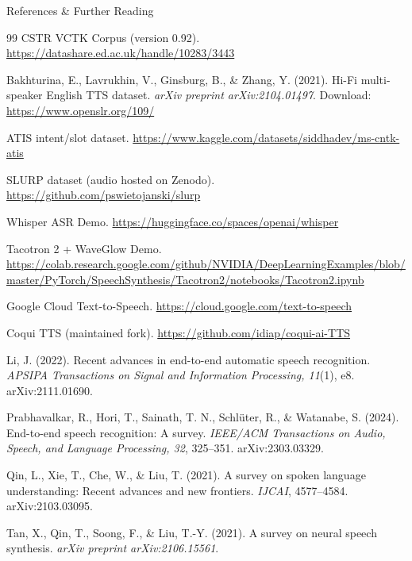 \begin{frame}[allowframebreaks]{References \& Further Reading}
\begin{thebibliography}{99}
CSTR VCTK Corpus (version 0.92). \url{https://datashare.ed.ac.uk/handle/10283/3443}

Bakhturina, E., Lavrukhin, V., Ginsburg, B., \& Zhang, Y. (2021). Hi-Fi multi-speaker English TTS dataset. \textit{arXiv preprint arXiv:2104.01497}. Download: \url{https://www.openslr.org/109/}

ATIS intent/slot dataset. \url{https://www.kaggle.com/datasets/siddhadev/ms-cntk-atis}

SLURP dataset (audio hosted on Zenodo). \url{https://github.com/pswietojanski/slurp}

Whisper ASR Demo. \url{https://huggingface.co/spaces/openai/whisper}

Tacotron 2 + WaveGlow Demo. \url{https://colab.research.google.com/github/NVIDIA/DeepLearningExamples/blob/master/PyTorch/SpeechSynthesis/Tacotron2/notebooks/Tacotron2.ipynb}

Google Cloud Text-to-Speech. \url{https://cloud.google.com/text-to-speech}

Coqui TTS (maintained fork). \url{https://github.com/idiap/coqui-ai-TTS}

Li, J. (2022). Recent advances in end-to-end automatic speech recognition. \textit{APSIPA Transactions on Signal and Information Processing, 11}(1), e8. arXiv:2111.01690.

Prabhavalkar, R., Hori, T., Sainath, T. N., Schlüter, R., \& Watanabe, S. (2024). End-to-end speech recognition: A survey. \textit{IEEE/ACM Transactions on Audio, Speech, and Language Processing, 32}, 325--351. arXiv:2303.03329.

Qin, L., Xie, T., Che, W., \& Liu, T. (2021). A survey on spoken language understanding: Recent advances and new frontiers. \textit{IJCAI}, 4577--4584. arXiv:2103.03095.

Tan, X., Qin, T., Soong, F., \& Liu, T.-Y. (2021). A survey on neural speech synthesis. \textit{arXiv preprint arXiv:2106.15561}.

\end{thebibliography}

\end{frame}
